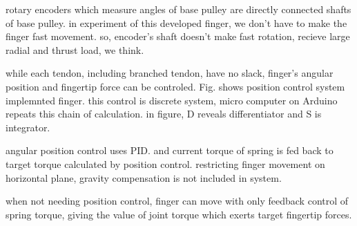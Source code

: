 \documentclass{llncs}
\begin{document}
rotary encoders which measure angles of base pulley are directly connected shafts of base pulley.
in experiment of this developed finger, we don't have to make the finger fast movement.
so, encoder's shaft doesn't make fast rotation, recieve large radial and thrust load, we think. 

while each tendon, including branched tendon, have no slack, finger's angular position and fingertip force can be controled.
Fig. shows position control system implemnted finger.
this control is discrete system, micro computer on Arduino repeats this chain of calculation.
in figure, D reveals differentiator and S is integrator.

angular position control uses PID.
and current torque of spring is fed back to target torque calculated by position control.
restricting finger movement on horizontal plane, gravity compensation is not included in system.

when not needing position control, finger can move with only feedback control of spring torque, giving the value of joint torque which exerts target fingertip forces.





\end{document}
